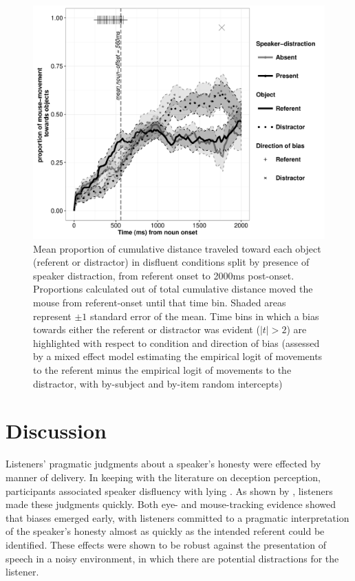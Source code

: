 \documentclass[a4paper,man,natbib]{apa6}
\begin{document}
\begin{figure}[Ht]
  \centering
	\includegraphics[width=\linewidth]{mouse_disf.pdf}
  \caption{Mean proportion of cumulative distance traveled toward each object (referent or distractor) in disfluent conditions split by presence of speaker distraction, from referent onset to 2000ms post-onset. Proportions calculated out of total cumulative distance moved the mouse from referent-onset until that time bin. Shaded areas represent $\pm 1$ standard error of the mean. Time bins in which a bias towards either the referent or distractor was evident ($|t|>2$) are highlighted with respect to condition and direction of bias (assessed by a mixed effect model estimating the empirical logit of movements to the referent minus the empirical logit of movements to the distractor, with by-subject and by-item random intercepts)}
  \label{fig:mdis}
\end{figure}


\section{Discussion}
Listeners' pragmatic judgments about a speaker's honesty were effected by manner of delivery.
In keeping with the literature on deception perception, participants associated speaker disfluency with lying \citep{Zuckerman1981,depaulo2003cues}. 
As shown by \citet{Loy2016}, listeners made these judgments quickly.
Both eye- and mouse-tracking evidence showed that biases emerged early, with listeners committed to a pragmatic interpretation of the speaker's honesty almost as quickly as the intended referent could be identified.
These effects were shown to be robust against the presentation of speech in a noisy environment, in which there are potential distractions for the listener.
\end{document}
